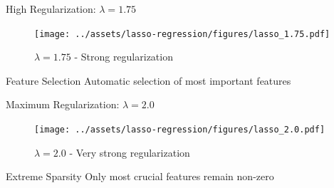\documentclass{beamer}
\begin{document}
\begin{frame}{High Regularization: $\lambda = 1.75$}
\begin{figure}\texttt{[image: ../assets/lasso-regression/figures/lasso\_1.75.pdf]}\caption{{\footnotesize $\lambda = 1.75$ - Strong regularization}}
\end{figure}

\begin{codebox}{Feature Selection}
Automatic selection of most important features
\end{codebox}
\end{frame}


\begin{frame}{Maximum Regularization: $\lambda = 2.0$}
\begin{figure}\texttt{[image: ../assets/lasso-regression/figures/lasso\_2.0.pdf]}\caption{{\footnotesize $\lambda = 2.0$ - Very strong regularization}}
\end{figure}

\begin{alertbox}{Extreme Sparsity}
Only most crucial features remain non-zero
\end{alertbox}
\end{frame}



%
%
%
%
%
%
%
%
%
%
\end{document}
